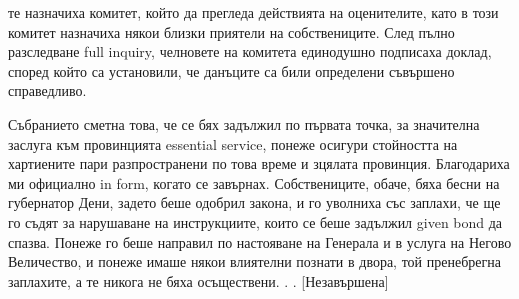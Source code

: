 \documentclass[12pt]{book}
\begin{document}
те назначиха комитет, който да прегледа действията на оценителите, като в този комитет назначиха някои близки приятели на собствениците. След пълно разследване full inquiry, челновете на комитета единодушно подписаха доклад, според който са установили, че данъците са били определени съвършено справедливо. 

Събранието сметна това, че се бях задължил по първата точка, за значителна заслуга към провинцията essential service, понеже осигури стойността на хартиените пари разпространени по това време и зцялата провинция. Благодариха ми официално in form, когато се завърнах. Собствениците, обаче, бяха бесни на губернатор Дени, задето беше одобрил закона, и го уволниха със заплахи, че ще го съдят за нарушаване на инструкциите, които се беше задължил given bond да спазва. Понеже го беше направил по настояване на Генерала и в услуга на Негово Величество, и понеже имаше някои влиятелни познати в двора, той пренебрегна заплахите, а те никога не бяха осъществени. . . [Незавършена]
\end{document}
